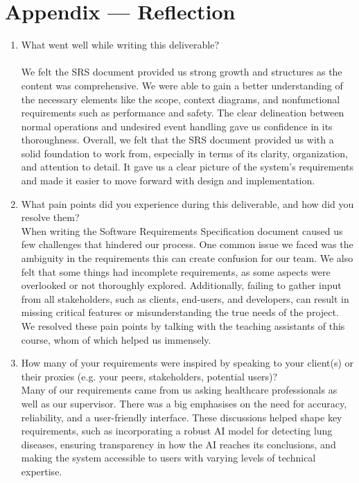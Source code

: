 \documentclass[12pt]{article}
\begin{document}
\section*{Appendix --- Reflection}

\begin{enumerate}
  \item What went well while writing this deliverable? \\\\
We felt the SRS document provided us strong growth and structures as the content was comprehensive. We were able to gain a better understanding of the necessary elements like the scope, context diagrams, and nonfunctional requirements such as performance and safety. The clear delineation between normal operations and undesired event handling gave us confidence in its thoroughness. Overall, we felt that the SRS document provided us with a solid foundation to work from, especially in terms of its clarity, organization, and attention to detail. It gave us a clear picture of the system's requirements and made it easier to move forward with design and implementation.


  \item What pain points did you experience during this deliverable, and how did
  you resolve them? \\

When writing the Software Requirements Specification document caused us few challenges that hindered our process. One common issue we faced was the ambiguity in the requirements this can create confusion for our team. We also felt that some things had incomplete requirements, as some aspects were overlooked or not thoroughly explored. Additionally, failing to gather input from all stakeholders, such as clients, end-users, and developers, can result in missing critical features or misunderstanding the true needs of the project. We resolved these pain points by talking with the teaching assistants of this course, whom of which helped us immensely.  


  \item How many of your requirements were inspired by speaking to your
  client(s) or their proxies (e.g. your peers, stakeholders, potential users)? \\
  
Many of our requirements came from us asking healthcare professionals as well as our supervisor. There was a big emphasises on the need for accuracy, reliability, and a user-friendly interface. These discussions helped shape key requirements, such as incorporating a robust AI model for detecting lung diseases, ensuring transparency in how the AI reaches its conclusions, and making the system accessible to users with varying levels of technical expertise.
      

\end{enumerate}
\end{document}

